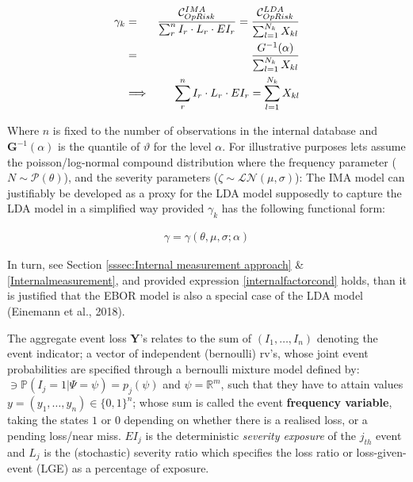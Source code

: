 \documentclass{DissertateUSU}
\begin{document}
\singlespacing

\begin{eqnarray}
\gamma_k &=& \frac{\mathcal{\Large{C}}_{OpRisk}^{IMA}}{\sum_r^n I_r\cdot L_r\cdot EI_r} = \frac{\mathcal{\Large{C}}_{OpRisk}^{LDA}}{\sum_{l=1}^{N_{k}}X_{kl}}\nonumber\\
&=& \frac{G^{-1}(\alpha)}{\sum_{l=1}^{N_{k}}X_{kl}}\\
&\Longrightarrow& \sum_r^n I_r\cdot L_r\cdot EI_r = \sum_{l=1}^{N_{k}}X_{kl}\nonumber\\
\end{eqnarray} \doublespacing

Where \(n\) is fixed to the number of observations in the internal
database and \(\mathbf{G}^{-1}(\alpha)\) is the quantile of
\(\vartheta\) for the level \(\alpha\). For illustrative purposes lets
assume the poisson/log-normal compound distribution where the frequency
parameter (\(N \sim \mathcal{P}(\theta)\)), and the severity parameters
(\(\zeta \sim \mathcal{LN}(\mu,\sigma)\)): The IMA model can justifiably
be developed as a proxy for the LDA model supposedly to capture the LDA
model in a simplified way provided \(\gamma_k\) has the following
functional form:

\singlespacing

\begin{eqnarray}\label{internalfactorcond}
\gamma = \gamma(\theta, \mu, \sigma;\alpha)
\end{eqnarray} \doublespacing

In turn, see Section \ref{sssec:Internal measurement approach} \&
\ref{Internalmeasurement}, and provided expression
\ref{internalfactorcond} holds, than it is justified that the EBOR model
is also a special case of the LDA model (Einemann et al., 2018).\medskip

The aggregate event loss \(\mathbf{Y}\)'s relates to the sum of
\((I_1,\ldots,I_n)\) denoting the event indicator; a vector of
independent (bernoulli) rv's, whose joint event probabilities are
specified through a bernoulli mixture model defined by:
\(\ni \mathbb{P}(I_j=1|\Psi=\psi)=p_j(\psi)\) and \(\psi=\mathbb{R}^m\),
such that they have to attain values
\(y=(y_1,\ldots,y_n) \in \{0,1\}^n\); whose sum is called the event
\textbf{frequency variable}, taking the states \(1\) or \(0\) depending
on whether there is a realised loss, or a pending loss/near miss.
\(EI_j\) is the deterministic \emph{severity exposure} of the \(j_{th}\)
event and \(L_j\) is the (stochastic) severity ratio which specifies the
loss ratio or loss-given-event (LGE) as a percentage of exposure.
\end{document}
